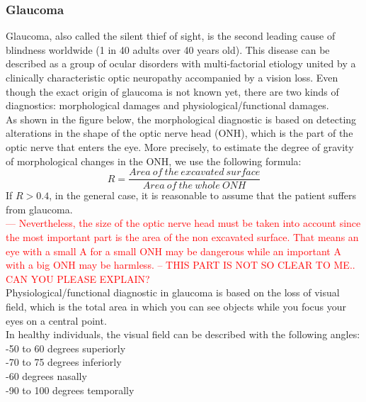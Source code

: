 \documentclass[english,12pt]{article}
\begin{document}
\subsubsection{Glaucoma}
Glaucoma, also called the silent thief of sight, is the second leading cause of blindness worldwide (1 in 40 adults over 40 years old). This disease can be described as a group of ocular disorders with multi-factorial etiology united by a clinically characteristic optic neuropathy accompanied by a vision loss. Even though the exact origin of glaucoma is not known yet, there are two kinds of diagnostics: morphological damages and physiological/functional damages.\\
As shown in the figure below, the morphological diagnostic is based on detecting alterations in the shape of the optic nerve head (ONH), which is the part of the optic nerve that enters the eye.
 More precisely, to estimate the degree of gravity of morphological changes in the ONH, we use the following formula:
$$ R=\frac{Area\ of\ the\ excavated\ surface}{Area\ of\ the\ whole\ ONH}$$
If $R>0.4$, in the general case, it is reasonable to assume that the patient suffers from glaucoma.\\

\textcolor{red}{--- Nevertheless, the size of the optic nerve head must be taken into account since the most important part is the area of the non excavated surface. That means an eye with a small A for a small ONH may be dangerous while an important A with a big ONH may be harmless. -- THIS PART IS NOT SO CLEAR TO ME.. CAN YOU PLEASE EXPLAIN?}\\

Physiological/functional diagnostic in glaucoma is based on the loss of visual field, which is the total area in which you can see objects while you focus your eyes on a central point.\\
In healthy individuals, the visual field can be described with the following angles:\\
-50 to 60 degrees superiorly\\
-70 to 75 degrees inferiorly\\
-60 degrees nasally\\
-90 to 100 degrees temporally\\
\end{document}
